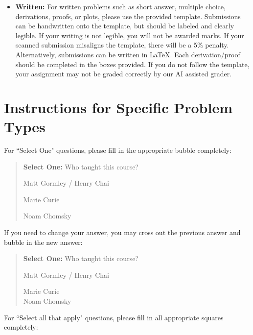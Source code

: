 \documentclass[11pt,addpoints,answers]{exam}
\begin{document}
\begin{itemize}
\begin{itemize}
   \item \textbf{Written:} For written problems such as short answer, multiple choice, derivations, proofs, or plots, please use the provided template. Submissions can be handwritten onto the template, but should be labeled and clearly legible. If your writing is not legible, you will not be awarded marks. If your scanned submission misaligns the template, there will be a 5\% penalty. Alternatively, submissions can be written in LaTeX. 
   Each derivation/proof should be completed in the boxes provided. If you do not follow the template, your assignment may not be graded correctly by our AI assisted grader.
  \end{itemize}

\end{itemize}\clearpage

\section*{Instructions for Specific Problem Types}

For ``Select One" questions, please fill in the appropriate bubble completely:

\begin{quote}
\textbf{Select One:} Who taught this course?
\begin{list}{}
     \item\CIRCLE{} Matt Gormley / Henry Chai
     \item\Circle{} Marie Curie
     \item\Circle{} Noam Chomsky
\end{list}
\end{quote}


If you need to change your answer, you may cross out the previous answer and bubble in the new answer:

\begin{quote}
\textbf{Select One:} Who taught this course?
\begin{list}{}
     \item\CIRCLE{} Matt Gormley / Henry Chai
     \item\Circle{} Marie Curie\\
     \xcancel{\CIRCLE}{} Noam Chomsky
\end{list}
\end{quote}


For ``Select all that apply" questions, please fill in all appropriate squares completely:
\end{document}

